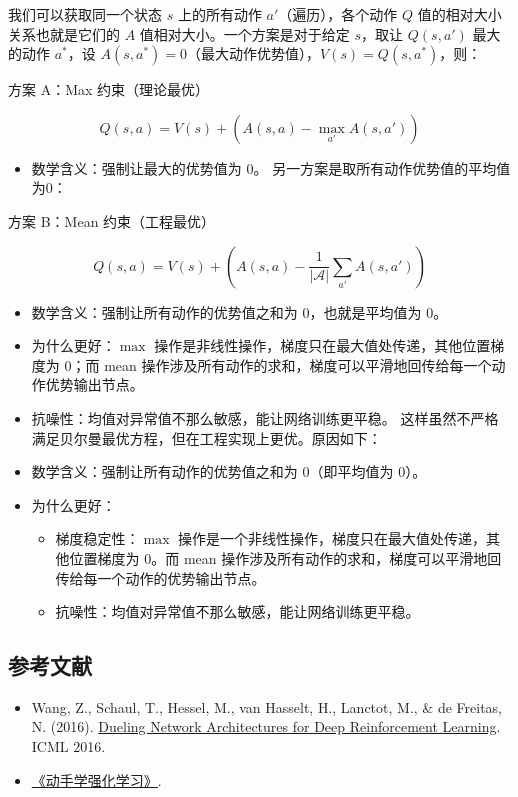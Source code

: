 我们可以获取同一个状态 \(s\) 上的所有动作 \(a'\)（遍历），各个动作 \(Q\) 值的相对大小关系也就是它们的 \(A\) 值相对大小。一个方案是对于给定 \(s\)，取让 \(Q(s,a')\) 最大的动作 \(a^*\)，设 \(A(s,a^*)=0\)（最大动作优势值），\(V(s)=Q(s,a^*)\)，则：

方案 A：Max 约束（理论最优）

\[
Q(s,a)=V(s)+(A(s,a)-\max_{a'}A(s,a'))
\]

\begin{itemize}
\tightlist
\item
  数学含义：强制让最大的优势值为 \(0\)。
  另一方案是取所有动作优势值的平均值为0：
\end{itemize}

方案 B：Mean 约束（工程最优）

\[
Q(s,a)=V(s)+(A(s,a)-\frac{1}{|\mathcal{A}|}\sum_{a'}A(s,a'))
\]

\begin{itemize}
\item
  数学含义：强制让所有动作的优势值之和为 \(0\)，也就是平均值为 \(0\)。
\item
  为什么更好：\(\max\) 操作是非线性操作，梯度只在最大值处传递，其他位置梯度为 \(0\)；而 mean 操作涉及所有动作的求和，梯度可以平滑地回传给每一个动作优势输出节点。
\item
  抗噪性：均值对异常值不那么敏感，能让网络训练更平稳。
  这样虽然不严格满足贝尔曼最优方程，但在工程实现上更优。原因如下：
\item
  数学含义：强制让所有动作的优势值之和为 \(0\)（即平均值为 \(0\)）。
\item
{}
  为什么更好：

  \begin{itemize}
  \tightlist
  \item
    梯度稳定性：\(\max\) 操作是一个非线性操作，梯度只在最大值处传递，其他位置梯度为 \(0\)。而 mean 操作涉及所有动作的求和，梯度可以平滑地回传给每一个动作的优势输出节点。
  \item
    抗噪性：均值对异常值不那么敏感，能让网络训练更平稳。
  \end{itemize}
\end{itemize}

\FloatBarrier
{}
\hypertarget{ux53c2ux8003ux6587ux732e-52}{%
\subsection{参考文献}\label{ux53c2ux8003ux6587ux732e-52}}

\vspace{0.25em}
\begin{itemize}
\tightlist
\item
  Wang, Z., Schaul, T., Hessel, M., van Hasselt, H., Lanctot, M., \& de Freitas, N. (2016). \href{https://arxiv.org/abs/1511.06581}{Dueling Network Architectures for Deep Reinforcement Learning}. ICML 2016.
\item
  \href{https://hrl.boyuai.com/}{《动手学强化学习》}.
\end{itemize}

\clearpage

